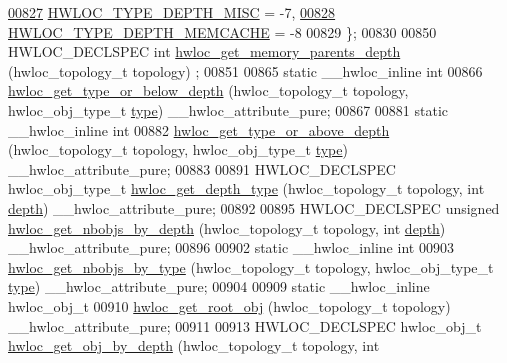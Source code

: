 \begin{DoxyCode}
\hyperlink{a00187_ggaf4e663cf42bbe20756b849c6293ef575a96436a392b4cdcaa1a29bc65351b373f}{00827}     \hyperlink{a00187_ggaf4e663cf42bbe20756b849c6293ef575a96436a392b4cdcaa1a29bc65351b373f}{HWLOC\_TYPE\_DEPTH\_MISC} = -7,       
\hyperlink{a00187_ggaf4e663cf42bbe20756b849c6293ef575a8b8d7d300c018c0eb65e6c9a9f162101}{00828}     \hyperlink{a00187_ggaf4e663cf42bbe20756b849c6293ef575a8b8d7d300c018c0eb65e6c9a9f162101}{HWLOC\_TYPE\_DEPTH\_MEMCACHE} = -8    
00829 \};
00830 
00850 HWLOC\_DECLSPEC \textcolor{keywordtype}{int} \hyperlink{a00187_gae85786340b88e24835f8c403a1e2e54b}{hwloc\_get\_memory\_parents\_depth} (hwloc\_topology\_t topology)
      ;
00851 
00865 \textcolor{keyword}{static} \_\_hwloc\_inline \textcolor{keywordtype}{int}
00866 \hyperlink{a00187_ga8125328e69eba709c33ea8055c12589b}{hwloc\_get\_type\_or\_below\_depth} (hwloc\_topology\_t topology, hwloc\_obj\_type\_t 
      \hyperlink{a00238_acc4f0803f244867e68fe0036800be5de}{type}) \_\_hwloc\_attribute\_pure;
00867 
00881 \textcolor{keyword}{static} \_\_hwloc\_inline \textcolor{keywordtype}{int}
00882 \hyperlink{a00187_ga8a9ee573b7d2190272095d10712a7cca}{hwloc\_get\_type\_or\_above\_depth} (hwloc\_topology\_t topology, hwloc\_obj\_type\_t 
      \hyperlink{a00238_acc4f0803f244867e68fe0036800be5de}{type}) \_\_hwloc\_attribute\_pure;
00883 
00891 HWLOC\_DECLSPEC hwloc\_obj\_type\_t \hyperlink{a00187_ga506b0682b98aa264d53e934d2e9badb0}{hwloc\_get\_depth\_type} (hwloc\_topology\_t topology, \textcolor{keywordtype}{int} 
      \hyperlink{a00238_a4876fd165b4fff35521f07ebd85355ed}{depth}) \_\_hwloc\_attribute\_pure;
00892 
00895 HWLOC\_DECLSPEC \textcolor{keywordtype}{unsigned} \hyperlink{a00187_ga1d5ceafe8130fe6e8657bf0bc666ba50}{hwloc\_get\_nbobjs\_by\_depth} (hwloc\_topology\_t topology, \textcolor{keywordtype}{int} 
      \hyperlink{a00238_a4876fd165b4fff35521f07ebd85355ed}{depth}) \_\_hwloc\_attribute\_pure;
00896 
00902 \textcolor{keyword}{static} \_\_hwloc\_inline \textcolor{keywordtype}{int}
00903 \hyperlink{a00187_ga789a3f65aedff644be64a18526a03065}{hwloc\_get\_nbobjs\_by\_type} (hwloc\_topology\_t topology, hwloc\_obj\_type\_t 
      \hyperlink{a00238_acc4f0803f244867e68fe0036800be5de}{type}) \_\_hwloc\_attribute\_pure;
00904 
00909 \textcolor{keyword}{static} \_\_hwloc\_inline hwloc\_obj\_t
00910 \hyperlink{a00187_ga2d4b12fc187dfc53b35f2fa21d21044d}{hwloc\_get\_root\_obj} (hwloc\_topology\_t topology) \_\_hwloc\_attribute\_pure;
00911 
00913 HWLOC\_DECLSPEC hwloc\_obj\_t \hyperlink{a00187_ga391f6b2613f0065673eaa4069b93d4e0}{hwloc\_get\_obj\_by\_depth} (hwloc\_topology\_t topology, \textcolor{keywordtype}{int} 

\end{DoxyCode}
